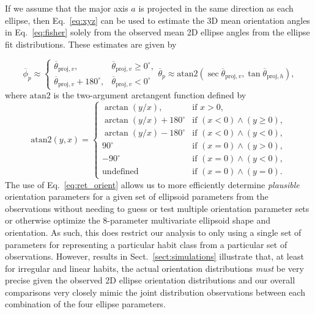 \documentclass[amt, manuscript]{copernicus}
\begin{document}
If we assume that the major axis $a$ is projected in the same direction as each ellipse, then Eq.~\ref{eq:xyz} can be used to estimate the 3D mean orientation angles in Eq.~\ref{eq:fisher} solely from the observed mean 2D ellipse angles from the ellipse fit distributions. These estimates are given by

\begin{subequations}\label{eq:ret_orient}
    \begin{equation}\label{eq:ret_orient_phi}
	\overline{\phi}_{p} \approx \begin{cases} 

	 \overline{\theta}_{\mathrm{proj},v}, & \overline{\theta}_{\mathrm{proj},v} \geq 0^{\circ}, \\
	 \overline{\theta}_{\mathrm{proj},v} + 180^{\circ},  & \overline{\theta}_{\mathrm{proj},v}  < 0^{\circ}
	\end{cases}    
    \end{equation}
    \begin{equation}\label{eq:ret_orient_theta}
        \overline{\theta}_{p} \approx \mathrm{atan2}(\sec \overline{\theta}_{\mathrm{proj},v},\tan \overline{\theta}_{\mathrm{proj},h}),
    \end{equation}
\end{subequations}
where $\mathrm{atan2}$ is the two-argument arctangent function defined by
\begin{equation}
    \mathrm{atan2}(y,x) = \begin{cases}
        \arctan(y/x), & \textrm{if } x>0, \\
        \arctan(y/x)+180^{\circ} & \textrm{if } (x<0) \land (y\geq 0), \\
        \arctan(y/x) - 180^{\circ} & \textrm{if } (x<0) \land (y<0),\\
        90^{\circ} & \textrm{if } (x=0) \land (y>0),\\
        -90^{\circ} & \textrm{if } (x=0) \land (y<0),\\
        \textrm{undefined} & \textrm{if } (x=0) \land (y=0).
    \end{cases}
\end{equation}
The use of Eq.~\ref{eq:ret_orient} allows us to more efficiently determine \textit{plausible} orientation parameters for a given set of ellipsoid parameters from the observations without needing to guess or test multiple orientation parameter sets or otherwise optimize the 8-parameter multivariate ellipsoid shape and orientation. As such, this does restrict our analysis to only using a single set of parameters for representing a particular habit class from a particular set of observations. However, results in Sect.~\ref{sect:simulations} illustrate that, at least for irregular and linear habits, the actual orientation distributions \textit{must} be very precise given the observed 2D ellipse orientation distributions and our overall comparisons very closely mimic the joint distribution observations between each combination of the four ellipse parameters. 
\end{document}

